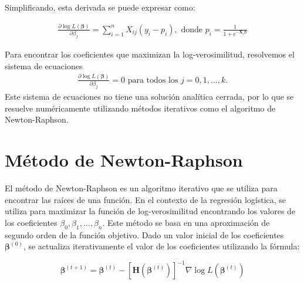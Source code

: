 \documentclass[a4paper]{report} %
\begin{document}
Simplificando, esta derivada se puede expresar como:

\begin{eqnarray}\label{Eq.PrimeraDerivada}
\frac{\partial \log L(\boldsymbol{\beta})}{\partial \beta_j} = \sum_{i=1}^{n} X_{ij} (y_i - p_i),\textrm{ donde }p_i = \frac{1}{1 + e^{-\mathbf{X}_i \boldsymbol{\beta}}}
\end{eqnarray}

Para encontrar los coeficientes que maximizan la log-verosimilitud, resolvemos el sistema de ecuaciones 
\begin{eqnarray*}
\frac{\partial \log L(\boldsymbol{\beta})}{\partial \beta_j} = 0 \textrm{ para todos los }j = 0, 1, \ldots, k. 
\end{eqnarray*}
Este sistema de ecuaciones no tiene una solución analítica cerrada, por lo que se resuelve numéricamente utilizando métodos iterativos como el algoritmo de Newton-Raphson.

\section{Método de Newton-Raphson}

El método de Newton-Raphson es un algoritmo iterativo que se utiliza para encontrar las raíces de una función. En el contexto de la regresión logística, se utiliza para maximizar la función de log-verosimilitud encontrando los valores de los coeficientes $\beta_0, \beta_1, \ldots, \beta_n$. Este m\'etodo se basa en una aproximación de segundo orden de la función objetivo. Dado un valor inicial de los coeficientes $\boldsymbol{\beta}^{(0)}$, se actualiza iterativamente el valor de los coeficientes utilizando la fórmula:

\begin{equation}\label{Eq.Criterio0}
\boldsymbol{\beta}^{(t+1)} = \boldsymbol{\beta}^{(t)} - \left[ \mathbf{H}(\boldsymbol{\beta}^{(t)}) \right]^{-1} \nabla \log L(\boldsymbol{\beta}^{(t)})
\end{equation}
\end{document}
